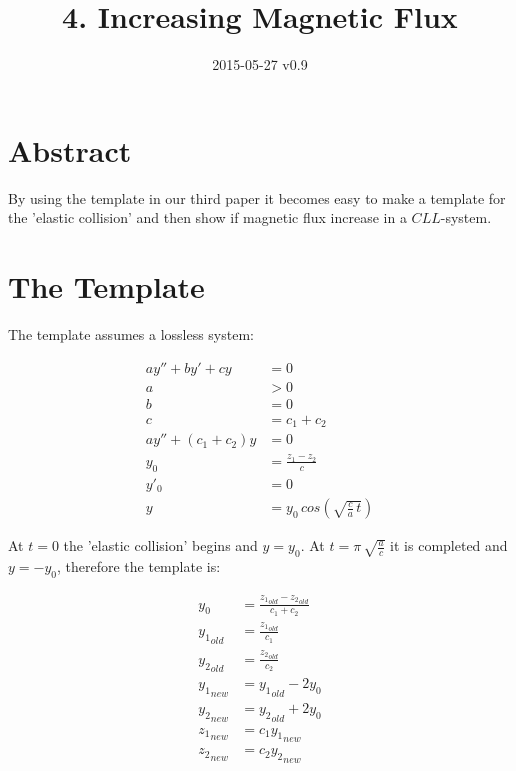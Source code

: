 \documentclass[]{elementary-physics}
\title{4. Increasing Magnetic Flux}
\date{2015-05-27 v0.9}
\begin{document}
\maketitle

\tableofcontents

\section{Abstract}

By using the template in our third paper\cite{ef3ch} it becomes easy to make a template for the 'elastic collision' and then show if magnetic flux increase in a $CLL$-system.

\section{The Template}

The template assumes a lossless system:

\begin{subequations}
\begin{align}
a y'' + b y' + c y &= 0 \\
a &> 0 \\
b &= 0 \\
c &= c_1 + c_2 \\
a y'' + (c_1 + c_2) y &= 0 \\
y_0 &= \frac{z_1-z_2}{c} \\
y'_0 &= 0 \\
y &= y_0 \, cos(\sqrt{\frac{c}{a} \, t})
\end{align}
\end{subequations}

At $t=0$ the 'elastic collision' begins and $y=y_0$.
At $t = \pi \, \sqrt{\frac{a}{c}}$ it is completed and $y = -y_0$, therefore the template is:

\begin{subequations}
\begin{align}
y_0 &= \frac{{z_1}_{old}-{z_2}_{old}}{c_1 + c_2} \\
{y_1}_{old} &= \frac{{z_1}_{old}}{c_1} \\
{y_2}_{old} &= \frac{{z_2}_{old}}{c_2} \\
{y_1}_{new} &= {y_1}_{old} -2 y_0 \\
{y_2}_{new} &= {y_2}_{old} +2 y_0 \\
{z_1}_{new} &= c_1 {y_1}_{new} \\
{z_2}_{new} &= c_2 {y_2}_{new}
\end{align}
\end{subequations}
\end{document}
